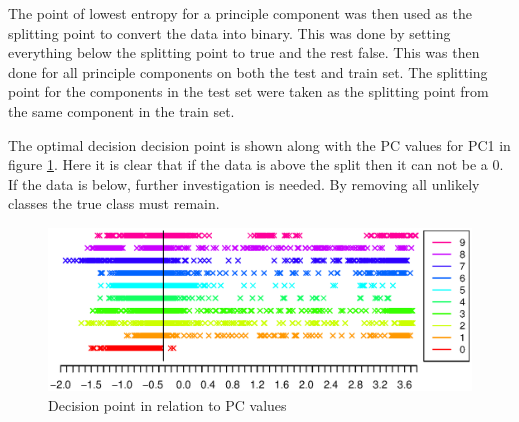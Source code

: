 The point of lowest entropy for a principle component was then used as the splitting point to convert the data into binary.
This was done by setting everything below the splitting point to true and the rest false.
This was then done for all principle components on both the test and train set. 
The splitting point for the components in the test set were taken as the splitting point from the same component in the train set.

The optimal decision decision point is shown along with the PC values for PC1 in figure \ref{fig:decision_point}. 
Here it is clear that if the data is above the split then it can not be a 0.
If the data is below, further investigation is needed.
By removing all unlikely classes the true class must remain.

\begin{figure}[H]
\includegraphics[width = \textwidth]{graphics/decision_seperation}
\caption{Decision point in relation to PC values}
\label{fig:decision_point}
\end{figure}